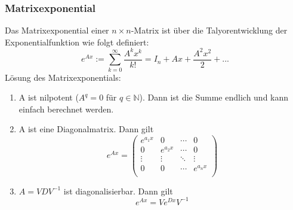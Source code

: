 \documentclass[8pt, a4paper, landscape, fleqn]{scrartcl}
\def\N{\mathbb{N}}
\begin{document}
\begin{multicols*}{3}
			    \subsubsection{Matrixexponential}
			    Das Matrixexponential einer $n \times n$-Matrix ist über die Talyorentwicklung der Exponentialfunktion wie folgt definiert: 
			    \begin{equation*}
			        e^{Ax} := \sum_{k=0}^{\infty} \frac{A^k x^k}{k!} = I_n + Ax + \frac{A^2 x^2}{2} +...
			    \end{equation*}
			    Lösung des Matrixexponentials: 
			    \begin{enumerate}
			        \item A ist nilpotent ($A^q = 0$ für $q \in \N$). Dann ist die Summe endlich und kann einfach berechnet werden.
			        \item A ist eine Diagonalmatrix. Dann gilt 
			        \begin{equation*}
			            e^{Ax} = 
			            \begin{pmatrix}
			                e^{a_1x} & 0 & \cdots & 0 \\
			                0 & e^{a_2x} & \cdots & 0 \\
			                \vdots & \vdots & \ddots & \vdots \\
			                0 & 0 & \cdots & e^{a_nx} \\
			            \end{pmatrix}
			        \end{equation*}
			        \item $A = VDV^{-1}$ ist diagonalisierbar. Dann gilt 
			        \begin{equation*}
    			            e^{Ax} = Ve^{Dx}V^{-1}
    			    \end{equation*}
			    \end{enumerate}

\end{multicols*}
\end{document}
